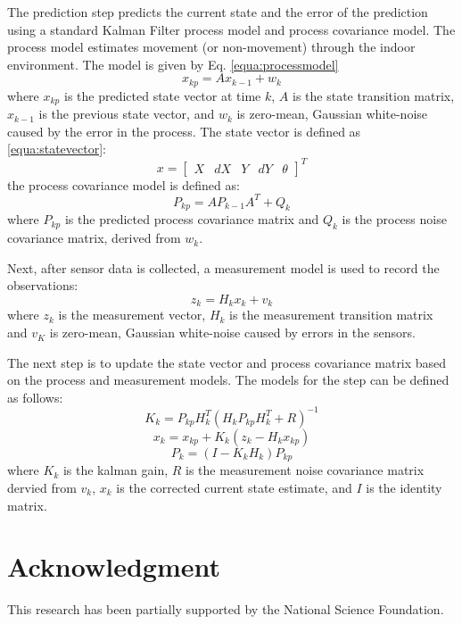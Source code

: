 \documentclass[conference]{IEEEtran}
\begin{document}
The prediction step predicts the current state and the error of the prediction using a standard Kalman Filter process model and process covariance model. The process model estimates movement (or non-movement) through the indoor environment. The model is given by Eq. \ref{equa:processmodel}
\begin{equation}
\label{equa:processmodel}
x_{kp} = Ax_{k-1} + w_k
\end{equation}
where $x_{kp}$ is the predicted state vector at time $k$, $A$ is the state transition matrix, $x_{k-1}$ is the previous state vector, and $w_k$ is zero-mean, Gaussian white-noise caused by the error in the process. The state vector is defined as \ref{equa:statevector}:
\begin{equation}
\label{equa:statevector}
x =
\begin{bmatrix}
  X & dX & Y & dY & \theta
\end{bmatrix}^T
\end{equation}
the process covariance model is defined as:
\begin{equation}
P_{kp} = AP_{k-1}A^T + Q_k
\end{equation}
where $P_{kp}$ is the predicted process covariance matrix and $Q_k$ is the process noise covariance matrix, derived from $w_k$.

Next, after sensor data is collected, a measurement model is used to record the observations:
\begin{equation}
z_k = H_kx_{k} + v_k
\end{equation}
where $z_k$ is the measurement vector, $H_k$ is the measurement transition matrix and $v_K$ is zero-mean, Gaussian white-noise caused by errors in the sensors.

The next step is to update the state vector and process covariance matrix based on the process and measurement models. The models for the step can be defined as follows:
\begin{equation}
K_k = P_{kp}H_k^T(H_kP_{kp}H_k^T + R)^{-1}
\end{equation}
\begin{equation}
x_k = x_{kp} + K_k(z_k - H_kx_{kp})
\end{equation}
\begin{equation}
P_k = (I - K_kH_k)P_{kp}
\end{equation}
where $K_k$ is the kalman gain, $R$ is the measurement noise covariance matrix dervied from $v_k$, $x_k$ is the corrected current state estimate, and $I$ is the identity matrix.



\section*{Acknowledgment}
This research has been partially supported by the National Science Foundation.




\end{document}

